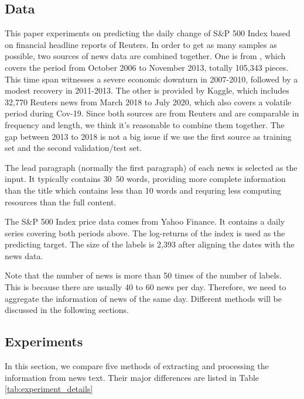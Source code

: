 \documentclass[11pt]{article}
\begin{document}
\subsection{Data}

This paper experiments on predicting the daily change of S\&P 500 Index based on financial headline reports of Reuters. In order to get as many samples as possible, two sources of news data are combined together. One is from \citet{ding-etal-2014-using}, which covers the period from October 2006 to November 2013, totally 105,343 pieces. This time span witnesses a severe economic downturn in 2007-2010, followed by a modest recovery in 2011-2013. The other is provided by Kaggle, which includes 32,770 Reuters news from March 2018 to July 2020, which also covers a volatile period during Cov-19. Since both sources are from Reuters and are comparable in frequency and length, we think it's reasonable to combine them together. The gap between 2013 to 2018 is not a big issue if we use the first source as training set and the second validation/test set. 

The lead paragraph (normally the first paragraph) of each news is selected as the input. It typically contains 30~50 words, providing more complete information than the title which contains less than 10 words and requring less computing resources than the full content.

The S\&P 500 Index price data comes from Yahoo Finance. It contains a daily series covering both periods above. The log-returns of the index is used as the predicting target. The size of the labels is 2,393 after aligning the dates with the news data. 

Note that the number of news is more than 50 times of the number of labels. This is because there are usually 40 to 60 news per day. Therefore, we need to aggregate the information of news of the same day. Different methods will be discussed in the following sections. 

\subsection{Experiments}

In this section, we compare five methods of extracting and processing the information from news text. Their major differences are listed in Table \ref{tab:experiment_details}
\end{document}
